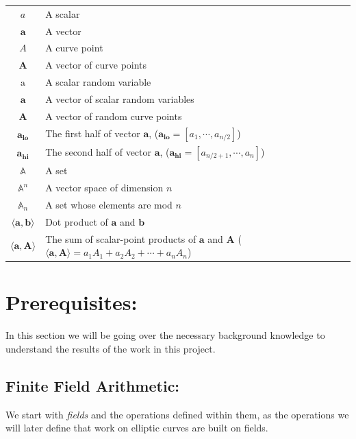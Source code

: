 \documentclass{article}
\renewcommand{\vec}[1]{\boldsymbol{#1}}
\newcommand{\ran}[1]{\mathrm{#1}}
\newcommand{\vecran}[1]{\mathbf{#1}}
\newcommand{\dotp}[2]{\langle #1, #2 \rangle}
\newcommand{\opn}[1]{\operatorname{#1}}
\newcommand{\veclo}[1]{\vec{#1_{\opn{lo}}}}
\newcommand{\vechi}[1]{\vec{#1_{\opn{hi}}}}
\begin{document}
\begin{center}
\begin{tabular}{ c l }
	$a$                       & A scalar \\
	$\vec{a}$                 & A vector \\
	$A$                       & A curve point \\
	$\vec{A}$                 & A vector of curve points \\
	$\ran{a}$                 & A scalar random variable \\
	$\vecran{a}$              & A vector of scalar random variables \\
	$\vecran{A}$              & A vector of random curve points \\
	$\veclo{a}$               & The first half of vector $\vec{a}$, ($\veclo{a} = [a_{1}, \cdots, a_{n/2}]$) \\
	$\vechi{a}$               & The second half of vector $\vec{a}$, ($\vechi{a} = [a_{n/2+1}, \cdots, a_{n}]$) \\
	$\mathbb{A}$              & A set \\
	$\mathbb{A}^n$            & A vector space of dimension $n$ \\ 
	$\mathbb{A}_n$            & A set whose elements are mod $n$ \\ 
	$\dotp{\vec{a}}{\vec{b}}$ & Dot product of $\vec{a}$ and $\vec{b}$ \\
	$\dotp{\vec{a}}{\vec{A}}$ & The sum of scalar-point products of $\vec{a}$ and $\vec{A}$ ($\dotp{\vec{a}}{\vec{A}} = a_1 A_1 + a_2 A_2 + \cdots + a_n A_n$) \\
\end{tabular}
\end{center}

\section{Prerequisites:}

In this section we will be going over the necessary background knowledge
to understand the results of the work in this project.

\subsection{Finite Field Arithmetic:} \label{Finite Field Arithmetic}

We start with \textit{fields} and the operations defined within
them, as the operations we will later define that work on elliptic
curves are built on fields.
\end{document}
